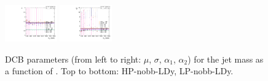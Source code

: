 \begin{figure}[htbp]
  \includegraphics[width=0.2\textwidth]{fig/2Dfit/paramSignalShape_allSig_MJJ_LP_nobb_LDy_alpha.pdf}
  \includegraphics[width=0.2\textwidth]{fig/2Dfit/paramSignalShape_allSig_MJJ_LP_nobb_LDy_alpha2.pdf}\\
  \caption{
    DCB parameters (from left to right: $\mu$, $\sigma$, $\alpha_1$, $\alpha_2$) for the jet mass \MJ as a function of \MX.
    Top to bottom: HP-nobb-LDy, LP-nobb-LDy.
  }
  \label{fig:MJJShapeParam_LDy_Run2}
\end{figure}

